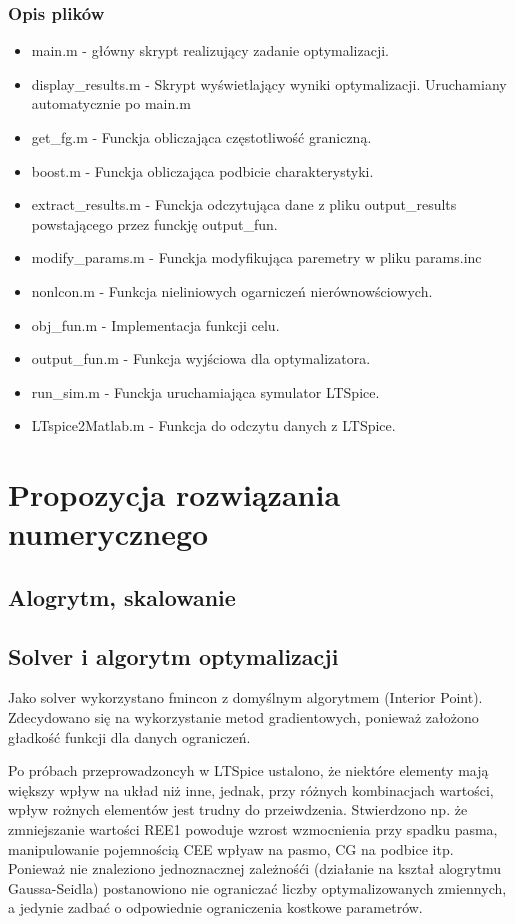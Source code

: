 \documentclass{article}
\begin{document}
\subsubsection*{Opis plików}
\begin{itemize}
	\item main.m - główny skrypt realizujący zadanie optymalizacji. 
	\item display\_results.m - Skrypt wyświetlający wyniki optymalizacji. Uruchamiany automatycznie po main.m
	\item get\_fg.m - Funckja obliczająca częstotliwość graniczną.
	\item boost.m - Funckja obliczająca podbicie charakterystyki.
	\item extract\_results.m - Funckja odczytująca dane z pliku output\_results powstającego przez funckję output\_fun.
	\item modify\_params.m - Funckja modyfikująca paremetry w pliku params.inc
	\item nonlcon.m - Funkcja nieliniowych ogarniczeń nierównowściowych.
	\item obj\_fun.m - Implementacja funkcji celu.
	\item output\_fun.m - Funkcja wyjściowa dla optymalizatora.  
	\item run\_sim.m - Funckja uruchamiająca symulator LTSpice.
	\item LTspice2Matlab.m - Funkcja do odczytu danych z LTSpice.
\end{itemize}

\section{Propozycja rozwiązania numerycznego}
\subsection{Alogrytm, skalowanie}
\subsection*{Solver i algorytm optymalizacji}
Jako solver wykorzystano fmincon z domyślnym algorytmem (Interior Point). Zdecydowano się na wykorzystanie
metod gradientowych, ponieważ założono gładkość funkcji dla danych ograniczeń. 

Po próbach przeprowadzoncyh w LTSpice ustalono, że niektóre elementy mają większy wpływ na układ niż inne, jednak, przy różnych kombinacjach wartości, wpływ rożnych elementów jest trudny do przeiwdzenia.
Stwierdzono np. że zmniejszanie wartości REE1 powoduje wzrost wzmocnienia przy spadku pasma, manipulowanie pojemnością CEE wpłyaw na pasmo, CG na podbice itp. 
Ponieważ nie znaleziono jednoznacznej zależnośći (działanie na kształ alogrytmu Gaussa-Seidla) postanowiono nie ograniczać liczby optymalizowanych zmiennych, a jedynie zadbać o odpowiednie 
ograniczenia kostkowe parametrów.
\end{document}
